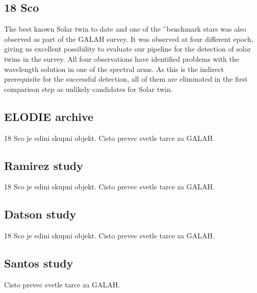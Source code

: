 \subsection{18 Sco}
The best known Solar twin to date and one of the \G\ benchmark stars was also observed as part of the GALAH survey. It was observed at four different epoch, giving us excellent possibility to evaluate our pipeline for the detection of solar twins in the survey. All four observations have identified problems with the wavelength solution in one of the spectral arms. As this is the indirect prerequisite for the successful detection, all of them are eliminated in the first comparison step as unlikely candidates for Solar twin.

\subsection{ELODIE archive}
\cite{2016A&A...587A.131M}
18 Sco je edini skupni objekt. Cisto prevec svetle tarce za GALAH.

\subsection{Ramirez study}
\cite{2009A&A...508L..17R}
18 Sco je edini skupni objekt. Cisto prevec svetle tarce za GALAH.

\subsection{Datson study}
\cite{2015A&A...574A.124D}
18 Sco je edini skupni objekt. Cisto prevec svetle tarce za GALAH.

\subsection{Santos study}
\cite{2016A&A...592A.156D} Cisto prevec svetle tarce za GALAH.

